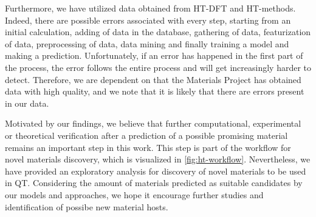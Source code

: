 Furthermore, we have utilized data obtained from HT-DFT and HT-methods. Indeed, there are possible errors associated with every step, starting from an initial calculation, adding of data in the database, gathering of data, featurization of data, preprocessing of data, data mining and finally training a model and making a prediction. Unfortunately, if an error has happened in the first part of the process, the error follows the entire process and will get increasingly harder to detect. Therefore, we are dependent on that the Materials Project has obtained data with high quality, and we note that it is likely that there are errors present in our data. %

Motivated by our findings, we believe that further computational, experimental or theoretical verification after a prediction of a possible promising material remains an important step in this work. This step is part of the workflow for novel materials discovery, which is visualized in \autoref{fig:ht-workflow}. Nevertheless, we have provided an exploratory analysis for discovery of novel materials to be used in QT. Considering the amount of materials predicted as suitable candidates by our models and approaches, we hope it encourage further studies and identification of possibe new material hosts.

